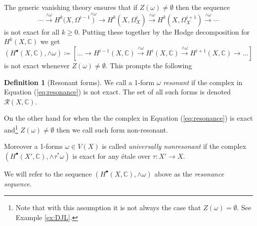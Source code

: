 \documentclass[11pt,reqno]{amsart}
\theoremstyle{definition}
\newtheorem{definition}[theorem]{Definition}
\theoremstyle{remark}
\theoremstyle{cited}
\theoremstyle{citeddef}
\newcommand{\C}{\mathbb{C}}
\newcommand{\sR}{\mathcal{R}}
\newcommand{\bbC}{\mathbb{C}}
\begin{document}
 
The generic vanishing theory 
\cite[Proposition 3.4]{GL} ensures that
if $Z(\omega)\neq \emptyset$ then the sequence
\[\cdots\overset{\wedge\omega}{\to} H^k(X, \Omega^{i-1}
\overset{\wedge\omega}){\to}H^k(X, \Omega_X^{i})
\overset{\wedge\omega}{\to} H^k(X,\Omega_X^{i+1})
\overset{\wedge\omega}{\to}\cdots\]
is not exact for all $k\geq 0$. Putting these together 
by the Hodge decomposition for $H^k(X,\bbC)$ we get
\begin{equation}
(H^{\bullet}(X,\bbC), \wedge\omega)\coloneqq [\ldots\to H^{i-1}(X,\C)\overset{\wedge\omega}{\longrightarrow}H^{i}(X,\C)\overset{\wedge\omega}{\longrightarrow}H^{i+1}(X,\C)\to\ldots]
\label{eq:resonance}
\end{equation}
is not exact whenever $Z(\omega)\neq \emptyset$. This prompts the following


\begin{definition}[Resonant forms]\label{def:resonance}
We call a 1-form $\omega$ \emph{resonant} if the complex 
in Equation (\ref{eq:resonance}) is not exact. The set of all such forms 
is denoted $\sR(X,\bbC)$.

On the other hand for when the the complex 
in Equation (\ref{eq:resonance}) is exact and\footnote{Note that
with this assumption it is not always the case that $Z(\omega) = \emptyset$. See Example \ref{ex:DJL}.} 
$Z(\omega) \neq \emptyset$ then we call such form non-resonant. 

Moreover a 1-forms $\omega\in V(X)$ is called \emph{universally nonresonant} if the complex
\newline $(H^{\bullet}(X',\bbC), \wedge\tau^*\omega)$
 is exact for any \'etale over $\tau\colon X'\to X$. 

We will refer to the sequence $(H^{\bullet}(X,\bbC), \wedge\omega)$ above as the \emph{resonance sequence}.
\end{definition}
\end{document}
